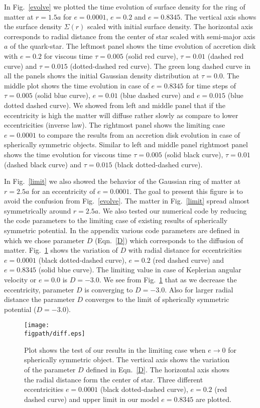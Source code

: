 \documentclass[useAMS,usenatbib]{mn2e}
\newcommand{\figpath}{./Figs/}
\begin{document}
In Fig.~\ref{evolve} we plotted the time evolution of surface density for the ring of matter at $r = 1.5a$ for $e = 0.0001$, $e = 0.2$ and $e = 0.8345$. The vertical axis shows the surface density $\Sigma(r)$ scaled with initial surface density. The horizontal axis corresponds to radial distance from the center of star scaled with semi-major axis $a$ of the quark-star. The leftmost panel shows the time evolution of accretion disk with $e = 0.2$ for viscous time $\tau = 0.005$ (solid red curve), $\tau = 0.01$ (dashed red curve) and $\tau = 0.015$ (dotted-dashed red curve). The green long dashed curve in all the panels shows the initial Gaussian density distribution at $\tau = 0.0$. The middle plot shows the time evolution in case of $e = 0.8345$ for time steps of $\tau = 0.005$ (solid blue curve), $e = 0.01$ (blue dashed curve) and $e = 0.015$ (blue dotted dashed curve). We showed from left and middle panel that if the eccentricity is high the matter will diffuse rather slowly as compare to lower eccentricities (inverse law). The rightmost panel shows the limiting case $e = 0.0001$ to compare the results from an accretion disk evolution in case of spherically symmetric objects. Similar to left and middle panel rightmost panel shows the time evolution for viscous time $\tau = 0.005$ (solid black curve), $\tau = 0.01$ (dashed black curve) and $\tau = 0.015$ (black dotted-dashed curve). 

In Fig.~\ref{limit} we also showed the behavior of the Gaussian ring of matter at $r = 2.5a$ for an eccentricity of $e = 0.0001$. The goal to present this figure is to avoid the confusion from Fig.~\ref{evolve}. The matter in Fig.~\ref{limit} spread almost symmetrically around $r = 2.5a$. We also tested our numerical code by reducing the code parameters to the limiting case of existing results of spherically symmetric potential. In the appendix various code parameters are defined in which we chose parameter $D$ (Eqn.~\ref{D}) which corresponds to the diffusion of matter. Fig.~\ref{diff} shows the variation of $D$ with radial distance for eccentricities $e = 0.0001$ (black dotted-dashed curve), $e = 0.2$ (red dashed curve) and $e = 0.8345$ (solid blue curve). The limiting value in case of Keplerian angular velocity or $e = 0.0$ is $D = -3.0$. We see from Fig.~\ref{diff} that as we decrease the eccentricity, parameter $D$ is converging to $D = -3.0$. Also for larger radial distance the parameter $D$ converges to the limit of spherically symmetric potential ($D = -3.0$).
\begin{figure}
\centering
\texttt{[image: \\figpath/diff.eps]}
\caption{\small{Plot shows the test of our results in the limiting case when $e \rightarrow 0$ for spherically symmetric object. The vertical axis shows the variation of the parameter $D$ defined in Eqn.~\ref{D}. The horizontal axis shows the radial distance form the center of star. Three different eccentricities $e = 0.0001$ (black dotted-dashed curve), $e = 0.2$ (red dashed curve) and upper limit in our model $e = 0.8345$ are plotted.}}
\label{diff}
\end{figure}
\end{document}

